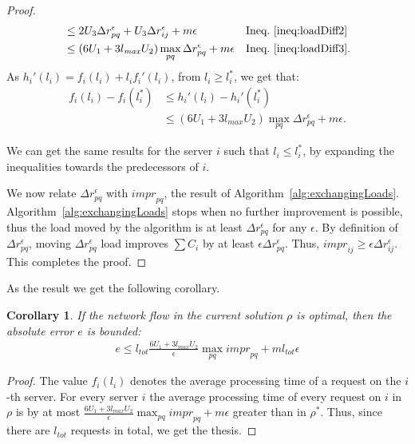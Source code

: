 \documentclass[11pt]{article}
\newcommand{\ltot}{{{l_{\mathit{tot}}}}}
\newcommand{\lmax}{{{l_{\mathit{max}}}}}
\newtheorem{corollary}[theorem]{Corollary}
\begin{document}
\begin{proof}
\begin{align*}
                             & \leq 2 U_3 \Delta r^{\epsilon}_{pq} + U_3 \Delta r^{\epsilon}_{ij}  + m\epsilon && \text{Ineq.~\ref{ineq:loadDiff2}}\\
                             & \leq (6U_1 + 3\lmax U_2) \max_{pq} \Delta r^{\epsilon}_{pq} + m\epsilon && \text{Ineq.~\ref{ineq:loadDiff3}.}
\end{align*}
As $h_i'(l_{i}) = f_i(l_i) + l_if_i'(l_i)$, from $l_i \geq l^{*}_{i}$, we get that:
\begin{align*}
f_i(l_i) -  f_i(l^{*}_{i}) & \leq h_i'(l_{i}) - h_i'(l^{*}_{i}) \\
& \leq (6U_1 + 3\lmax U_2) \max_{pq} \Delta r^{\epsilon}_{pq} + m\epsilon \text{.}
\end{align*}

We can get the same results for the server $i$ such that $l_{i} \leq l^{*}_{i}$, by expanding the inequalities towards the predecessors of $i$.

We now relate $\Delta r^{\epsilon}_{pq}$ with $\mathit{impr}_{pq}$, the result of Algorithm~\ref{alg:exchangingLoads}. Algorithm~\ref{alg:exchangingLoads} stops when no further improvement is possible, thus the load moved by the algorithm is at least $\Delta r^{\epsilon}_{pq}$ for any $\epsilon$. By definition of $\Delta r^{\epsilon}_{pq}$, moving $\Delta r^{\epsilon}_{pq}$ load improves $\sum{C_i}$ by at least $\epsilon \Delta r^{\epsilon}_{pq}$. Thus, 
$\mathit{impr}_{ij} \geq \epsilon \Delta r^{\epsilon}_{ij}$. 
This completes the proof.
\end{proof}

As the result we get the following corollary.

\begin{corollary}
If the network flow in the current solution $\rho$ is optimal, then the absolute error $e$ is bounded:
\begin{align*}
e \leq \ltot \frac{6U_1 + 3\lmax U_2}{\epsilon} \max_{pq} \mathit{impr}_{pq} + m\ltot\epsilon
\end{align*}
\end{corollary}
\begin{proof}
The value $f_i(l_i)$ denotes the average processing time of a request on the $i$-th server. For every server $i$ the average processing time of every request on $i$ in $\rho$ is by at most $\frac{6U_1 + 3\lmax U_2}{\epsilon} \max_{pq} \mathit{impr}_{pq} + m\epsilon$ greater than in $\rho^{*}$. Thus, since there are $\ltot$ requests in total, we get the thesis.
\end{proof}
\end{document}
